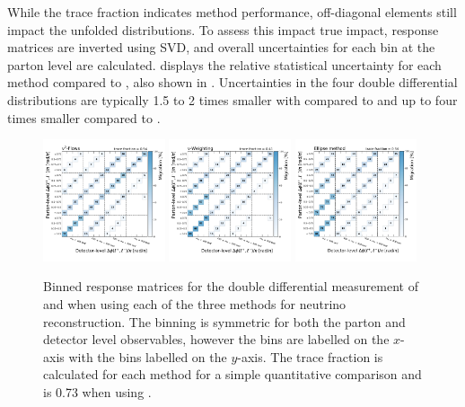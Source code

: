 While the trace fraction indicates method performance, off-diagonal elements still impact the unfolded distributions.
To assess this impact true impact, response matrices are inverted using SVD, and overall uncertainties for each bin at the parton level are calculated.
 displays the relative statistical uncertainty for each method compared to \vtruth, also shown in .
Uncertainties in the four double differential distributions are typically 1.5 to 2 times smaller with \vvflows compared to \vweight and up to four times smaller compared to \ellipse.

\begin{figure}[htp]
    \includegraphics[width=0.32\textwidth]{Figures/neutrino_unfolding/unfolding/unfold_lep_delphi_transformer_encoder.pdf}
    \includegraphics[width=0.32\textwidth]{Figures/neutrino_unfolding/unfolding/unfold_lep_delphi_nu_weighting.pdf}
    \includegraphics[width=0.32\textwidth]{Figures/neutrino_unfolding/unfolding/unfold_lep_delphi_nu_ellipse.pdf}
    \caption{Binned response matrices for the double differential measurement of \mttbar and \dphill when using each of the three methods for neutrino reconstruction. The binning is symmetric for both the parton and detector level observables, however the \mttbar bins are labelled on the $x$-axis with the \dphill bins labelled on the $y$-axis.
    The trace fraction is calculated for each method for a simple quantitative comparison and is 0.73 when using \vtruth.}
    \label{fig:unfold_dphill}
\end{figure}

